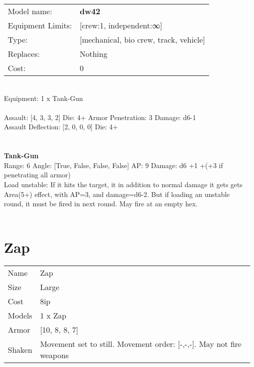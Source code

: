 \noindent
\begin{tabular}{ll}
Model name: &{\bf dw42 } \\
Equipment Limits: &[crew:1, independent:∞] \\
Type: &[mechanical, bio crew, track, vehicle] \\
Replaces: &Nothing \\
Cost: & 0\\
\end{tabular}
\ \\
Equipment: 1 x Tank-Gun \\
\ \\
Assault: [4, 3, 3, 2] Die: 4+ Armor Penetration: 3 Damage: d6-1 \\
Assault Deflection: [2, 0, 0, 0] Die: 4+\\
\indent  
\ \\

\ \\
{\bf Tank-Gun } \\



Range: 6  Angle: [True, False, False, False] AP: 9 Damage: d6 +1 +(+3 if penetrating all armor) \\
Load unstable: If it hits the target, it in addition to normal damage it gets gets Area(5+) effect, with AP=3, and damage=d6-2. But if loading an unstable round, it must be fired in next round. May fire at an empty hex.\\ 




 
\ \\













\clearpage

\section{ Zap }

\begin{tabular}{ll}
  Name & Zap \\
  Size & Large\\
  Cost & 8ip\\
  Models & 1 x Zap\\
  Armor & [10, 8, 8, 7]\\
  Shaken & Movement set to still. Movement order: [-,-,-]. May not fire weapons\\
\end{tabular}

